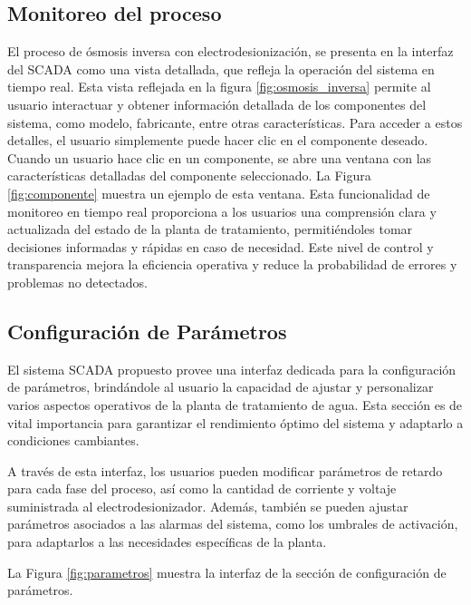 \subsection{Monitoreo del proceso}

El proceso de ósmosis inversa con electrodesionización, se presenta en la interfaz del SCADA como una vista detallada, que refleja la operación del sistema en tiempo real. Esta vista reflejada en la figura \ref{fig:osmosis_inversa} permite al usuario interactuar y obtener información detallada de los componentes del sistema, como modelo, fabricante, entre otras características. Para acceder a estos detalles, el usuario simplemente puede hacer clic en el componente deseado.
Cuando un usuario hace clic en un componente, se abre una ventana con las características detalladas del componente seleccionado. La Figura \ref{fig:componente} muestra un ejemplo de esta ventana.
Esta funcionalidad de monitoreo en tiempo real proporciona a los usuarios una comprensión clara y actualizada del estado de la planta de tratamiento, permitiéndoles tomar decisiones informadas y rápidas en caso de necesidad. Este nivel de control y transparencia mejora la eficiencia operativa y reduce la probabilidad de errores y problemas no detectados.
\subsection{Configuración de Parámetros}
El sistema SCADA propuesto provee una interfaz dedicada para la configuración de parámetros, brindándole al usuario la capacidad de ajustar y personalizar varios aspectos operativos de la planta de tratamiento de agua. Esta sección es de vital importancia para garantizar el rendimiento óptimo del sistema y adaptarlo a condiciones cambiantes.

A través de esta interfaz, los usuarios pueden modificar parámetros de retardo para cada fase del proceso, así como la cantidad de corriente y voltaje suministrada al electrodesionizador. Además, también se pueden ajustar parámetros asociados a las alarmas del sistema, como los umbrales de activación, para adaptarlos a las necesidades específicas de la planta.

La Figura \ref{fig:parametros} muestra la interfaz de la sección de configuración de parámetros.
